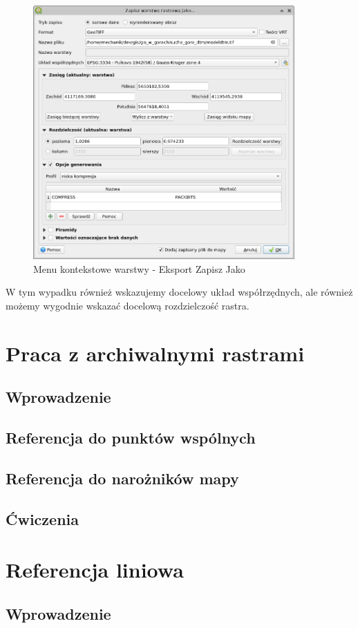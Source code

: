 \documentclass[a4paper,11pt, onecolumn, openany]{memoir}
\begin{document}
	\begin{figure}[!ht]
	\centering
	\includegraphics[width=10cm]{crs-cwiczenie2-zapisz-raster}
	\caption{Menu kontekstowe warstwy - Eksport Zapisz Jako}
\end{figure} 		
W tym wypadku również wskazujemy docelowy układ współrzędnych, ale również możemy wygodnie wskazać docelową rozdzielczość rastra.
	\chapter{Praca z archiwalnymi rastrami}
		\section{Wprowadzenie}
		\section{Referencja do punktów wspólnych}
		\section{Referencja do narożników mapy}
		\section{Ćwiczenia}

	\chapter{Referencja liniowa}
		\section{Wprowadzenie}
\end{document}
